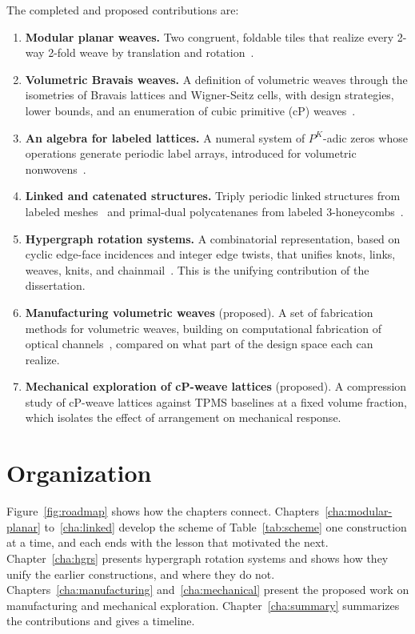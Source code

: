 The completed and proposed contributions are:

\begin{enumerate}
\item[\textbf{C1}] \textbf{Modular planar weaves.} Two congruent, foldable tiles that realize every 2-way 2-fold weave by translation and rotation~\cite{yildiz2023modular}.
\item[\textbf{C2}] \textbf{Volumetric Bravais weaves.} A definition of volumetric weaves through the isometries of Bravais lattices and Wigner-Seitz cells, with design strategies, lower bounds, and an enumeration of cubic primitive (cP) weaves~\cite{yildiz2025volumetric,akpanya2025enumeration}.
\item[\textbf{C3}] \textbf{An algebra for labeled lattices.} A numeral system of $P^K$-adic zeros whose operations generate periodic label arrays, introduced for volumetric nonwovens~\cite{yildiz2024nonwoven}.
\item[\textbf{C4}] \textbf{Linked and catenated structures.} Triply periodic linked structures from labeled meshes~\cite{yildiz2025linked} and primal-dual polycatenanes from labeled 3-honeycombs~\cite{yildiz2026polycatenane}.
\item[\textbf{C5}] \textbf{Hypergraph rotation systems.} A combinatorial representation, based on cyclic edge-face incidences and integer edge twists, that unifies knots, links, weaves, knits, and chainmail~\cite{yildiz2026hypergraph}. This is the unifying contribution of the dissertation.
\item[\textbf{C6}] \textbf{Manufacturing volumetric weaves} (proposed). A set of fabrication methods for volumetric weaves, building on computational fabrication of optical channels~\cite{deshpande2025optical}, compared on what part of the design space each can realize.
\item[\textbf{C7}] \textbf{Mechanical exploration of cP-weave lattices} (proposed). A compression study of cP-weave lattices against TPMS baselines at a fixed volume fraction, which isolates the effect of arrangement on mechanical response.
\end{enumerate}

\section{Organization}
\label{sec:organization}

Figure~\ref{fig:roadmap} shows how the chapters connect. Chapters~\ref{cha:modular-planar} to~\ref{cha:linked} develop the scheme of Table~\ref{tab:scheme} one construction at a time, and each ends with the lesson that motivated the next. Chapter~\ref{cha:hgrs} presents hypergraph rotation systems and shows how they unify the earlier constructions, and where they do not. Chapters~\ref{cha:manufacturing} and~\ref{cha:mechanical} present the proposed work on manufacturing and mechanical exploration. Chapter~\ref{cha:summary} summarizes the contributions and gives a timeline.

